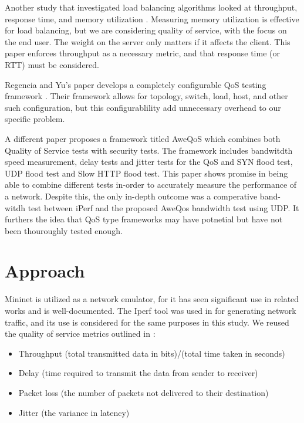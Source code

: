 \documentclass{article}
\begin{document}
Another study that investigated load balancing algorithms looked at throughput, response time, and memory utilization \cite{babbar_2022}. Measuring memory utilization 
is effective for load balancing, but we are considering quality of service, with the focus on the end user. The weight on the server only matters if it affects the 
client. This paper enforces throughput as a necessary metric, and that response time (or RTT) must be considered. 

Regencia and Yu's paper develops a completely configurable QoS testing framework \cite{regencia_2021}. Their framework allows for topology, switch, load, host, and 
other such configuration, but this configurablility add unnecessary overhead to our specific problem. 

A different paper \cite{AweQoS_2020} proposes a framework titled AweQoS which combines both Quality of Service tests with security tests. The framework includes bandwitdth speed measurement, delay tests and jitter tests for the QoS and SYN flood test, UDP flood test and Slow HTTP flood test. This paper shows promise in being able to combine different tests in-order to accurately measure the performance of a network. Despite this, the only in-depth outcome was a comperative band-witdh test between iPerf and the proposed AweQos bandwidth test using UDP. It furthers the idea that QoS type frameworks may have potnetial but have not been thouroughly tested enough.   

\section{Approach}
Mininet is utilized as a network emulator, for it has seen significant use in related works \cite{mininet_emulation_2014,qos_analysis_2022,chauhan_atulkar_2020} and 
is well-documented. The Iperf tool was used in \cite{chauhan_atulkar_2020} for generating network traffic, and its use is considered for the same purposes in this 
study. We reused the quality of service metrics outlined in \cite{qos_analysis_2022}: 
\begin{itemize}
    \item Throughput (total transmitted data in bits)/(total time taken in seconds)
    \item Delay (time required to transmit the data from sender to receiver)
    \item Packet loss (the number of packets not delivered to their destination)
    \item Jitter (the variance in latency)
\end{itemize} 
\end{document}
